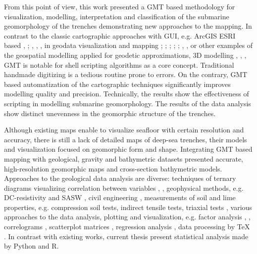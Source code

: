 \documentclass[11pt,a4paper]{report}
\begin{document}
{From this point of view, this work presented a \ac{GMT} based methodology for visualization, modelling, interpretation and classification of the submarine geomorphology of the trenches demonstrating new approaches to the mapping. In contrast to the classic cartographic approaches with \ac{GUI}, e.g. ArcGIS \ac{ESRI} based \cite{Klauco2013}, \cite{Klauco2017}; \cite{Suetovaetal2005b}, \cite{Lemenkova2012j}, \cite{Lemenkova2011c}, in geodata visualization and mapping \cite{Gauger2007}; \cite{Lemenkova2008a}; \cite{Lemenkova2007b}; \cite{Kuhnetal2006}; \cite{Suetovaetal2005a}; \cite{Klauco2013}, \cite{Klauco2014}, \cite{Lemenkova201554} or other examples of the geospatial modelling applied for geodetic approximations, 3D modelling \cite{Tomaszewski}, \cite{Banasik2017}, \cite{Janecka2019}, \ac{GMT} is notable for shell scripting algorithms as a core concept. Traditional handmade digitizing is a tedious routine prone to errors. On the contrary, \ac{GMT} based automatization of the cartographic techniques significantly improves modelling quality and precision. Technically, the results show the effectiveness of scripting in modelling submarine geomorphology. The results of the data analysis show distinct unevenness in the geomorphic structure of the trenches. 

Although existing maps enable to visualize seafloor with certain resolution and accuracy, there is still a lack of detailed maps of deep-sea trenches, their models and visualization focused on geomorphic form and shape. Integrating \ac{GMT} based mapping with geological, gravity and bathymetric datasets presented accurate, high-resolution geomorphic maps and cross-section bathymetric models. Approaches to the geological data analysis are diverse: techniques of ternary diagrams visualizing correlation between variables \cite{Reyes2010}, \cite{Lemenkova201991}, geophysical methods, e.g. DC-resistivity and SASW \cite{Lindh1999}, civil engineering \cite{Lemenkova202107}, measurements of soil and lime properties, e.g. compression soil tests, indirect tensile tests, triaxial tests \cite{Lindh2004}, various approaches to the data analysis, plotting and visualization, e.g. factor analysis \cite{ChilesDelfiner1999}, \cite{Lemenkova201866}, correlograms \cite{Lemenkova201871}, scatterplot matrices \cite{Lemenkova201901}, regression analysis \cite{Lemenkova201989}, data processing by TeX \cite{Lemenkova202103}. In contrast with existing works, current thesis present statistical analysis made by Python and R. 

}
\end{document}
